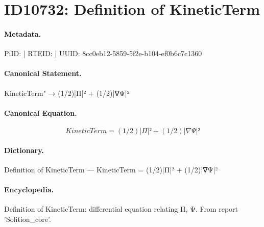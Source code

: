 \section*{ID10732: Definition of KineticTerm}
\paragraph{Metadata.}
PiID:  | RTEID:  | UUID: 8cc0eb12-5859-5f2e-b104-ef0b6c7c1360

\paragraph{Canonical Statement.}
KineticTerm" → (1/2)|Π|² + (1/2)|∇Ψ|²

\paragraph{Canonical Equation.}
\[
KineticTerm = (1/2)|Π|² + (1/2)|∇Ψ|²
\]

\paragraph{Dictionary.}
Definition of KineticTerm — KineticTerm = (1/2)|Π|² + (1/2)|∇Ψ|²

\paragraph{Encyclopedia.}
Definition of KineticTerm: differential equation relating Π, Ψ. From report 'Solition\_core'.
